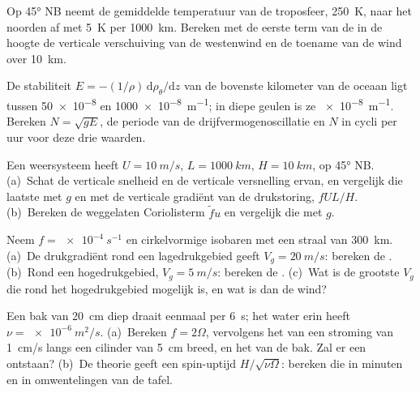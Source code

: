 \begin{exercise}[$\star$]\label{exo:b3:gfd-foundations:3}
Op \ang{45} NB neemt de gemiddelde temperatuur van de troposfeer, \qty{250}{K},
naar het noorden af met \qty{5}{K} per \qty{1000}{km}. Bereken met de eerste term van de
 in de hoogte de verticale verschuiving van de westenwind en
de toename van de wind over \qty{10}{km}.
\end{exercise}

\begin{exercise}[$\star$]\label{exo:b3:gfd-foundations:4}
De stabiliteit $E = -(1/\rho)\,\mathrm d\rho_\theta/\mathrm dz$ van de bovenste
kilometer van de oceaan ligt tussen \num{50e-8} en \qty{1000e-8}{m^{-1}};
in diepe geulen is ze \qty{e-8}{m^{-1}}. Bereken $N = \sqrt{gE}$, de
periode van de drijfvermogenoscillatie en $N$ in cycli per uur voor deze
drie waarden.
\end{exercise}

\begin{exercise}[$\star\star$]\label{exo:b3:gfd-foundations:5}
Een weersysteem heeft $U = \qty{10}{m/s}$, $L = \qty{1000}{km}$, $H =
\qty{10}{km}$, op \ang{45} NB. (a)~Schat de verticale snelheid en de
verticale versnelling ervan, en vergelijk die laatste met $g$ en met de
verticale gradiënt van de drukstoring, $fUL/H$. (b)~Bereken de
weggelaten Coriolisterm $\tilde fu$ en vergelijk die met $g$.
\end{exercise}

\begin{exercise}[$\star\star$]\label{exo:b3:gfd-foundations:6}
Neem $f = \qty{e-4}{s^{-1}}$ en cirkelvormige isobaren met een straal van
\qty{300}{km}. (a)~De drukgradiënt rond een lagedrukgebied geeft $V_g =
\qty{20}{m/s}$: bereken de . (b)~Rond een hogedrukgebied,
$V_g = \qty{5}{m/s}$: bereken de . (c)~Wat is de grootste
$V_g$ die rond het hogedrukgebied mogelijk is, en wat is dan de wind?
\end{exercise}

\begin{exercise}[$\star\star$]\label{exo:b3:gfd-foundations:7}
Een bak van \qty{20}{cm} diep draait eenmaal per \qty{6}{s}; het water erin heeft $\nu =
\qty{e-6}{m^2/s}$. (a)~Bereken $f = 2\Omega$, vervolgens het  van een
stroming van \qty{1}{cm/s} langs een cilinder van \qty{5}{cm} breed, en het 
van de bak. Zal er een  ontstaan? (b)~De theorie geeft een
spin-uptijd $H/\sqrt{\nu\Omega}$: bereken die in minuten en in omwentelingen van de tafel.
\end{exercise}

